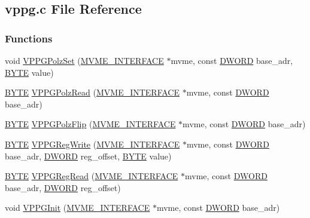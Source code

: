 \subsection{vppg.c File Reference}
\label{vppg_8c}
\subsubsection*{Functions}
\begin{DoxyCompactItemize}
\item 
void \hyperlink{vppg_8c_aba92a718f41a4d59f7ee3493fc703c42}{VPPGPolzSet} (\hyperlink{structMVME__INTERFACE}{MVME\_\-INTERFACE} $\ast$mvme, const \hyperlink{vt2_8h_a798af1e30bc65f319c1a246cecf59e39}{DWORD} base\_\-adr, \hyperlink{vt2_8h_a4ae1dab0fb4b072a66584546209e7d58}{BYTE} value)
\item 
\hyperlink{vt2_8h_a4ae1dab0fb4b072a66584546209e7d58}{BYTE} \hyperlink{vppg_8c_a5250200ded85e3f2e65c941384379ed5}{VPPGPolzRead} (\hyperlink{structMVME__INTERFACE}{MVME\_\-INTERFACE} $\ast$mvme, const \hyperlink{vt2_8h_a798af1e30bc65f319c1a246cecf59e39}{DWORD} base\_\-adr)
\item 
\hyperlink{vt2_8h_a4ae1dab0fb4b072a66584546209e7d58}{BYTE} \hyperlink{vppg_8c_ae7f3d0874c56189b93a9abde9c337714}{VPPGPolzFlip} (\hyperlink{structMVME__INTERFACE}{MVME\_\-INTERFACE} $\ast$mvme, const \hyperlink{vt2_8h_a798af1e30bc65f319c1a246cecf59e39}{DWORD} base\_\-adr)
\item 
\hyperlink{vt2_8h_a4ae1dab0fb4b072a66584546209e7d58}{BYTE} \hyperlink{vppg_8c_a4f6ab8a9fcc14540cbd36f5d9313e8e8}{VPPGRegWrite} (\hyperlink{structMVME__INTERFACE}{MVME\_\-INTERFACE} $\ast$mvme, const \hyperlink{vt2_8h_a798af1e30bc65f319c1a246cecf59e39}{DWORD} base\_\-adr, \hyperlink{vt2_8h_a798af1e30bc65f319c1a246cecf59e39}{DWORD} reg\_\-offset, \hyperlink{vt2_8h_a4ae1dab0fb4b072a66584546209e7d58}{BYTE} value)
\item 
\hyperlink{vt2_8h_a4ae1dab0fb4b072a66584546209e7d58}{BYTE} \hyperlink{vppg_8c_ab31234aa03b2821e9b5fc3be5a62d2fb}{VPPGRegRead} (\hyperlink{structMVME__INTERFACE}{MVME\_\-INTERFACE} $\ast$mvme, const \hyperlink{vt2_8h_a798af1e30bc65f319c1a246cecf59e39}{DWORD} base\_\-adr, \hyperlink{vt2_8h_a798af1e30bc65f319c1a246cecf59e39}{DWORD} reg\_\-offset)
\item 
void \hyperlink{vppg_8c_a379092e6b2de168766f8773009f75f2b}{VPPGInit} (\hyperlink{structMVME__INTERFACE}{MVME\_\-INTERFACE} $\ast$mvme, const \hyperlink{vt2_8h_a798af1e30bc65f319c1a246cecf59e39}{DWORD} base\_\-adr)
\item 

\end{DoxyCompactItemize}
